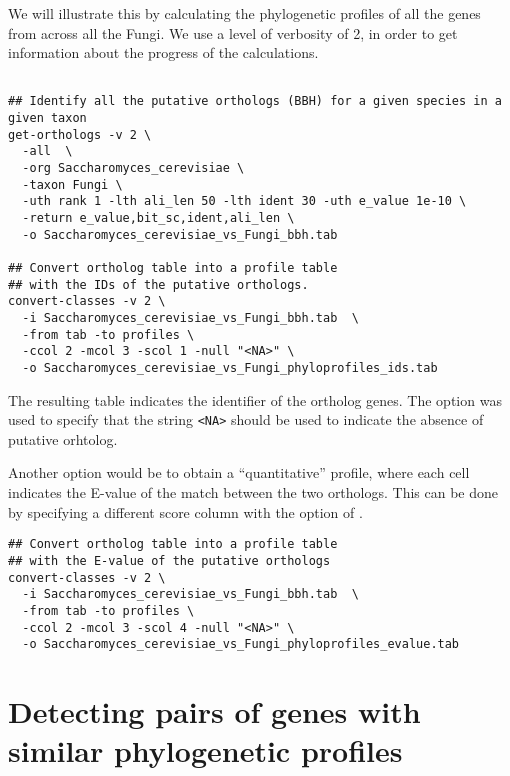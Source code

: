 We will illustrate this by calculating the phylogenetic profiles of
all the genes from  across all the
Fungi. We use a level of verbosity of 2, in order to get information
about the progress of the calculations.

\begin{footnotesize}
\begin{verbatim}

## Identify all the putative orthologs (BBH) for a given species in a given taxon
get-orthologs -v 2 \
  -all  \
  -org Saccharomyces_cerevisiae \
  -taxon Fungi \
  -uth rank 1 -lth ali_len 50 -lth ident 30 -uth e_value 1e-10 \
  -return e_value,bit_sc,ident,ali_len \
  -o Saccharomyces_cerevisiae_vs_Fungi_bbh.tab

## Convert ortholog table into a profile table
## with the IDs of the putative orthologs.
convert-classes -v 2 \
  -i Saccharomyces_cerevisiae_vs_Fungi_bbh.tab  \
  -from tab -to profiles \
  -ccol 2 -mcol 3 -scol 1 -null "<NA>" \
  -o Saccharomyces_cerevisiae_vs_Fungi_phyloprofiles_ids.tab

\end{verbatim}
\end{footnotesize}


The resulting table indicates the identifier of the ortholog
genes. The option \option{-null} was used to specify that the string
\texttt{<NA>} should be used to indicate the absence of putative
orhtolog.

Another option would be to obtain a ``quantitative'' profile, where
each cell indicates the E-value of the match between the two
orthologs. This can be done by specifying a different score column
with the option  of .

\begin{footnotesize}
\begin{verbatim}
## Convert ortholog table into a profile table
## with the E-value of the putative orthologs
convert-classes -v 2 \
  -i Saccharomyces_cerevisiae_vs_Fungi_bbh.tab  \
  -from tab -to profiles \
  -ccol 2 -mcol 3 -scol 4 -null "<NA>" \
  -o Saccharomyces_cerevisiae_vs_Fungi_phyloprofiles_evalue.tab
\end{verbatim}
\end{footnotesize}

\section{Detecting pairs of genes with similar phylogenetic profiles}

